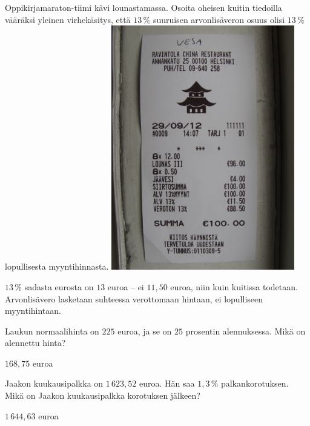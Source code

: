 \begin{tehtavasivu}
\begin{tehtava}
    Oppikirjamaraton-tiimi kävi lounastamassa. Osoita oheisen kuitin tiedoilla vääräksi yleinen virhekäsitys, että $13\,\%$ suuruisen arvonlisäveron osuus olisi $13\,\%$ lopullisesta myyntihinnasta.
    \includegraphics[width=80mm, angle=270]{pictures/alv-kuitti}
    \begin{vastaus}
         $13\,\%$ sadasta eurosta on $13$ euroa -- ei $11,50$ euroa, niin kuin kuitissa todetaan. Arvonlisävero lasketaan suhteessa verottomaan hintaan, ei lopulliseen myyntihintaan.
    \end{vastaus}
\end{tehtava}

\begin{tehtava}
    Laukun normaalihinta on $225$ euroa, ja se on $25$ prosentin alennuksessa. Mikä on alennettu hinta?
    \begin{vastaus}
        $168,75$ euroa
    \end{vastaus}
\end{tehtava}

\begin{tehtava}
    Jaakon kuukausipalkka on $1\,623,52$ euroa. Hän saa $1,3\,\%$ palkankorotuksen. Mikä on Jaakon kuukausipalkka korotuksen jälkeen?
    \begin{vastaus}
        $1\,644,63$ euroa
    \end{vastaus}
\end{tehtava}


\end{tehtavasivu}
